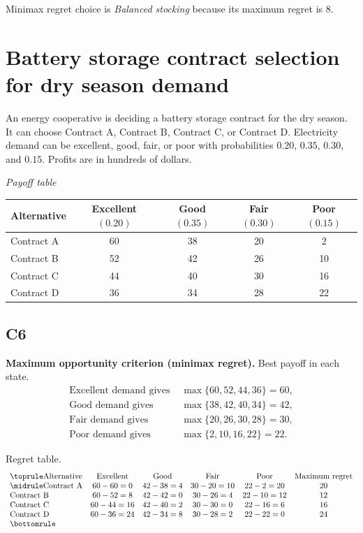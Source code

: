 \begin{ExamProblems}
		Minimax regret choice is \emph{Balanced stocking} because its maximum regret is $8$.

		\item
		\section{Battery storage contract selection for dry season demand}
		An energy cooperative is deciding a battery storage contract for the dry season. It can choose Contract A, Contract B, Contract C, or Contract D. Electricity demand can be excellent, good, fair, or poor with probabilities $0.20$, $0.35$, $0.30$, and $0.15$. Profits are in hundreds of dollars.

		\begin{center}
			\textit{Payoff table}\\
			\begin{tabular}{l c c c c}
				\toprule
				Alternative & Excellent $(0.20)$ & Good $(0.35)$ & Fair $(0.30)$ & Poor $(0.15)$ \\
				\midrule
				Contract A & 60 & 38 & 20 & 2 \\
				Contract B & 52 & 42 & 26 & 10 \\
				Contract C & 44 & 40 & 30 & 16 \\
				Contract D & 36 & 34 & 28 & 22 \\
				\bottomrule
			\end{tabular}
		\end{center}

		\subsection*{C6}
		\textbf{Maximum opportunity criterion (minimax regret).} Best payoff in each state.
		\[
		\begin{aligned}
		\text{Excellent demand gives } &\max\{60,52,44,36\}=60,\\
		\text{Good demand gives } &\max\{38,42,40,34\}=42,\\
		\text{Fair demand gives } &\max\{20,26,30,28\}=30,\\
		\text{Poor demand gives } &\max\{2,10,16,22\}=22.
		\end{aligned}
		\]

		Regret table.
		\[
		\begin{array}{lccccc}
			\toprule
			\text{Alternative} & \text{Excellent} & \text{Good} & \text{Fair} & \text{Poor} & \text{Maximum regret}\\
			\midrule
			\text{Contract A} & 60-60=0 & 42-38=4 & 30-20=10 & 22-2=20 & 20\\
			\text{Contract B} & 60-52=8 & 42-42=0 & 30-26=4 & 22-10=12 & 12\\
			\text{Contract C} & 60-44=16 & 42-40=2 & 30-30=0 & 22-16=6 & 16\\
			\text{Contract D} & 60-36=24 & 42-34=8 & 30-28=2 & 22-22=0 & 24\\
			\bottomrule
		\end{array}
		\]


\end{ExamProblems}
